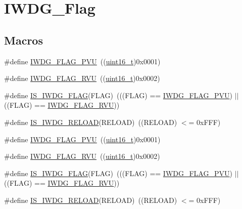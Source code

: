 \hypertarget{group___i_w_d_g___flag}{}\section{I\+W\+D\+G\+\_\+\+Flag}
\label{group___i_w_d_g___flag}
\subsection*{Macros}
\begin{DoxyCompactItemize}
\item 
\#define \hyperlink{group___i_w_d_g___flag_gae20afcf399fad1534e79a8d30ea86c9c}{I\+W\+D\+G\+\_\+\+F\+L\+A\+G\+\_\+\+P\+VU}~((\hyperlink{_p_e___types_8h_a1f1825b69244eb3ad2c7165ddc99c956}{uint16\+\_\+t})0x0001)
\item 
\#define \hyperlink{group___i_w_d_g___flag_ga3731bf2711c234ffe5b405fb6634ebca}{I\+W\+D\+G\+\_\+\+F\+L\+A\+G\+\_\+\+R\+VU}~((\hyperlink{_p_e___types_8h_a1f1825b69244eb3ad2c7165ddc99c956}{uint16\+\_\+t})0x0002)
\item 
\#define \hyperlink{group___i_w_d_g___flag_ga5be9ae9ba267cf09a00523ef3e219293}{I\+S\+\_\+\+I\+W\+D\+G\+\_\+\+F\+L\+AG}(F\+L\+AG)~(((F\+L\+AG) == \hyperlink{openmotestm_2library_2inc_2stm32f10x__iwdg_8h_ae20afcf399fad1534e79a8d30ea86c9c}{I\+W\+D\+G\+\_\+\+F\+L\+A\+G\+\_\+\+P\+VU}) $\vert$$\vert$ ((F\+L\+AG) == \hyperlink{openmotestm_2library_2inc_2stm32f10x__iwdg_8h_a3731bf2711c234ffe5b405fb6634ebca}{I\+W\+D\+G\+\_\+\+F\+L\+A\+G\+\_\+\+R\+VU}))
\item 
\#define \hyperlink{group___i_w_d_g___flag_ga7c319e96bded8e3c38c6a42a1b335c68}{I\+S\+\_\+\+I\+W\+D\+G\+\_\+\+R\+E\+L\+O\+AD}(R\+E\+L\+O\+AD)~((R\+E\+L\+O\+AD) $<$= 0x\+F\+F\+F)
\item 
\#define \hyperlink{group___i_w_d_g___flag_gae20afcf399fad1534e79a8d30ea86c9c}{I\+W\+D\+G\+\_\+\+F\+L\+A\+G\+\_\+\+P\+VU}~((\hyperlink{_p_e___types_8h_a1f1825b69244eb3ad2c7165ddc99c956}{uint16\+\_\+t})0x0001)
\item 
\#define \hyperlink{group___i_w_d_g___flag_ga3731bf2711c234ffe5b405fb6634ebca}{I\+W\+D\+G\+\_\+\+F\+L\+A\+G\+\_\+\+R\+VU}~((\hyperlink{_p_e___types_8h_a1f1825b69244eb3ad2c7165ddc99c956}{uint16\+\_\+t})0x0002)
\item 
\#define \hyperlink{group___i_w_d_g___flag_ga5be9ae9ba267cf09a00523ef3e219293}{I\+S\+\_\+\+I\+W\+D\+G\+\_\+\+F\+L\+AG}(F\+L\+AG)~(((F\+L\+AG) == \hyperlink{openmotestm_2library_2inc_2stm32f10x__iwdg_8h_ae20afcf399fad1534e79a8d30ea86c9c}{I\+W\+D\+G\+\_\+\+F\+L\+A\+G\+\_\+\+P\+VU}) $\vert$$\vert$ ((F\+L\+AG) == \hyperlink{openmotestm_2library_2inc_2stm32f10x__iwdg_8h_a3731bf2711c234ffe5b405fb6634ebca}{I\+W\+D\+G\+\_\+\+F\+L\+A\+G\+\_\+\+R\+VU}))
\item 
\#define \hyperlink{group___i_w_d_g___flag_ga7c319e96bded8e3c38c6a42a1b335c68}{I\+S\+\_\+\+I\+W\+D\+G\+\_\+\+R\+E\+L\+O\+AD}(R\+E\+L\+O\+AD)~((R\+E\+L\+O\+AD) $<$= 0x\+F\+F\+F)
\end{DoxyCompactItemize}



